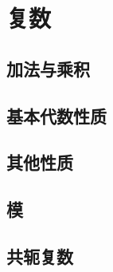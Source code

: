 \documentclass[a4paper, 11pt]{ctexbook}
\begin{document}
    \tableofcontents
    \chapter{复数}
        \section{加法与乘积}
        \section{基本代数性质}
            
        \section{其他性质}
        \section{模}
        \section{共轭复数}
            
\end{document}
